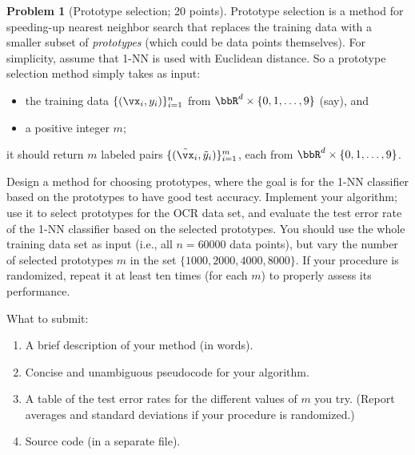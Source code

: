 \documentclass[11pt]{article}
\theoremstyle{definition}
\newtheorem{problem}{Problem}
\begin{document}

\begin{problem}[Prototype selection; 20 points]
  Prototype selection is a method for speeding-up nearest neighbor search that
  replaces the training data with a smaller subset of \emph{prototypes} (which
  could be data points themselves).
  For simplicity, assume that 1-NN is used with Euclidean distance.
  So a prototype selection method simply takes as input:
  \begin{itemize}
    \item
      the training data $\{ (\vx_i,y_i) \}_{i=1}^n$ from $\bbR^d \times
      \{0,1,\dotsc,9\}$ (say), and

    \item
      a positive integer $m$;

  \end{itemize}
  it should return $m$ labeled pairs $\{(\tilde\vx_i,\tilde y_i)\}_{i=1}^m$,
  each from $\bbR^d \times \{0,1,\dotsc,9\}$.

  Design a method for choosing prototypes, where the goal is for the 1-NN
  classifier based on the prototypes to have good test accuracy.
  Implement your algorithm; use it to select prototypes for the OCR data
  set, and evaluate the test error rate of the 1-NN classifier based on the
  selected prototypes.
  You should use the whole training data set as input (i.e., all $n=60000$ data
  points), but vary the number of selected prototypes $m$ in the set $\{ 1000,
  2000, 4000, 8000 \}$.
  If your procedure is randomized, repeat it at least ten times (for each $m$)
  to properly assess its performance.

  What to submit:
  \begin{enumerate}
    \item
      A brief description of your method (in words).

    \item
      Concise and unambiguous pseudocode for your algorithm.

    \item
      A table of the test error rates for the different values of $m$ you try.
      (Report averages and standard deviations if your procedure is randomized.)

    \item
      Source code (in a separate file).

  \end{enumerate}

\end{problem}
\end{document}
